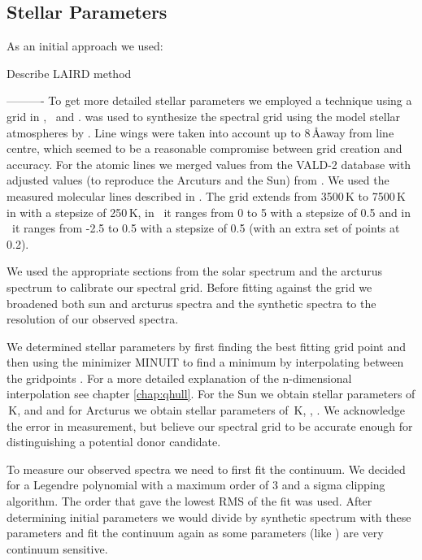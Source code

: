 \subsection{Stellar Parameters}
\label{sec:sn1006_stelparam}
As an initial approach we used: 

Describe LAIRD method

----------
To get more detailed stellar parameters we employed a technique using a grid in \teff, \logg\ and \feh. 
\moog \citep{1973ApJ...184..839S} was used to synthesize the spectral grid using the model stellar atmospheres by \citet{2003IAUS..210P.A20C}. Line wings were taken into account up to 8\,\AA away from line centre, which seemed to be a reasonable compromise between grid creation and accuracy. For the atomic lines we merged values from the VALD-2 database \citep{2000BaltA...9..590K} with adjusted values (to reproduce the Arcuturs and the Sun) from \cite{2008A&A...486..951G}. We used the measured
molecular lines described in  \citet{1995KurCD..23.....K}. 
The grid extends from 3500\,K to 7500\,K in \teff with a stepsize of 250\,K, in \logg\ it ranges from  0 to 5 with a stepsize of 0.5 and in \feh\ it ranges from -2.5 to 0.5 with a stepsize of 0.5 (with an extra set of points at 0.2). 

We used the appropriate sections from the solar spectrum \citep{1984sfat.book.....K} and the arcturus spectrum  \cite{2000vnia.book.....H} to calibrate our spectral grid. 
Before fitting against the grid we broadened both sun and arcturus spectra and the synthetic spectra to the resolution of our observed spectra. 

We determined stellar parameters by first finding the best fitting grid point and then using the minimizer MINUIT to find a minimum by interpolating between the gridpoints \citep[using][]{Barber96thequickhull}. For a more detailed explanation of the n-dimensional interpolation see chapter \ref{chap:qhull}. For the Sun we obtain stellar parameters of \,K,  and  and for Arcturus we obtain stellar parameters of \,K, , . 
We acknowledge the error in measurement, but believe our spectral grid to be accurate enough for distinguishing a potential donor candidate. 

To measure our observed spectra we need to first fit the continuum. We decided for a Legendre polynomial with a maximum order of 3 and a sigma clipping algorithm. The order that gave the lowest RMS of the fit was used. After determining initial parameters we would divide by synthetic spectrum with these parameters and fit the continuum again as some parameters (like \feh) are very continuum sensitive.  

